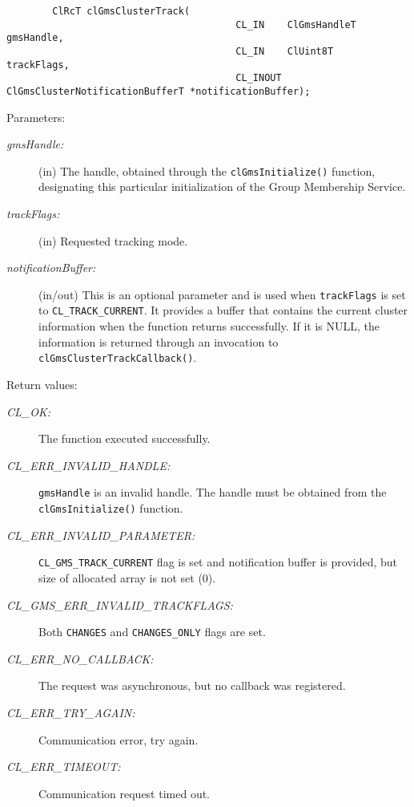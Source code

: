 \begin{flushleft}
\begin{Desc}
\footnotesize\begin{verbatim}        ClRcT clGmsClusterTrack(
                                		CL_IN    ClGmsHandleT           gmsHandle,
                                		CL_IN    ClUint8T               trackFlags,
                                		CL_INOUT ClGmsClusterNotificationBufferT *notificationBuffer);
\end{verbatim}
\normalsize
\end{Desc}
\begin{Desc}
\item[Parameters:]
\begin{description}
\item[{\em gms\-Handle:}](in) The handle, obtained through the {\tt{clGmsInitialize()}} function, designating this particular initialization of the
Group Membership Service. 
\item[{\em track\-Flags:}](in) Requested tracking mode.
\item[{\em notification\-Buffer:}](in/out) This is an optional parameter and is used when {\tt{trackFlags}} is set to {\tt{CL\_\-TRACK\_\-CURRENT}}.
It provides a buffer that contains the current cluster information when the function returns successfully. If it is NULL,
the information is returned through an invocation to {\tt{clGmsClusterTrackCallback()}}.\end{description}
\end{Desc}
\begin{Desc}
\item[Return values:]
\begin{description}
\item[{\em CL\_\-OK:}]The function executed successfully. 
\item[{\em CL\_\-ERR\_\-INVALID\_\-HANDLE:}]{\tt{gmsHandle}} is an invalid handle. The handle must be obtained from the
{\tt{clGmsInitialize()}} function. 
\item[{\em CL\_\-ERR\_\-INVALID\_\-PARAMETER:}]{\tt{CL\_\-GMS\_\-TRACK\_\-CURRENT}} flag is set and notification buffer is provided, but size of 
allocated array is not set (0). 
\item[{\em CL\_\-GMS\_\-ERR\_\-INVALID\_\-TRACKFLAGS:}]Both {\tt{CHANGES}} and {\tt{CHANGES\_\-ONLY}} flags are set. 
\item[{\em CL\_\-ERR\_\-NO\_\-CALLBACK:}]The request was asynchronous, but no callback was registered. 
\item[{\em CL\_\-ERR\_\-TRY\_\-AGAIN:}]Communication error, try again. 
\item[{\em CL\_\-ERR\_\-TIMEOUT:}]Communication request timed out.\end{description}

\end{Desc}
\end{flushleft}
